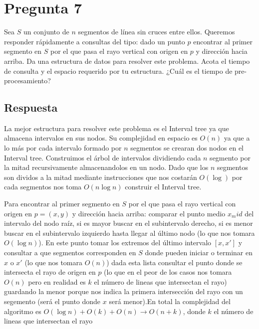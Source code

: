 \section*{Pregunta 7}
\noindent Sea $S$ un conjunto de $n$ segmentos de línea sin cruces entre ellos.
  Queremos responder rápidamente a consultas del tipo: dado un punto $p$ encontrar al primer segmento en $S$ por el que pasa el rayo vertical con origen en $p$ y dirección hacia arriba.
  Da una estructura de datos para resolver este problema.
  Acota el tiempo de consulta y el espacio requerido por tu estructura.
  ¿Cuál es el tiempo de pre-procesamiento?

\subsection*{Respuesta}
La mejor estructura para resolver este problema es el Interval tree ya que almacena intervalos en sus nodos. Su complejidad en espacio es $O(n)$ ya que a lo más por cada intervalo formado por $n$ segmentos se crearan dos nodos en el Interval tree. Construimos el árbol de intervalos dividiendo cada $n$ segmento por la mitad recursivamente almacenandolos en un nodo. Dado que los $n$ segmentos son dividos a la mitad mediante instrucciones que nos costarán $O(\log)$ por cada segmentos nos toma $O(n \log n)$ construir el Interval tree.

Para encontrar al primer segmento en $S$ por el que pasa el rayo vertical con origen en $p=(x,y)$ y dirección hacia arriba: comparar el punto medio $x_mid$ del intervalo del nodo raíz, si es mayor buscar en el subintervalo derecho, si es menor buscar en el subintervalo izquierdo hasta llegar al último nodo (lo que nos tomara $O(\log n)$). En este punto tomar los extremos del último intervalo $[x,x']$ y consultar a que segmentos corresponden en $S$ donde pueden iniciar o terminar en $x$ o $x'$ (lo que nos tomara $O(n)$) dada esta lista consultar el punto donde se intersecta el rayo de origen en $p$ (lo que en el peor de los casos nos tomara $O(n)$ pero en realidad es $k$ el número de lineas que intersectan el rayo) guardando la menor porque nos indica la primera intersección del rayo con un segemento (será el punto donde $x$ será menor).En total la complejidad del algoritmo es $O(\log n)+O(k)+O(n) \rightarrow O(n+k)$, donde $k$ el número de lineas que intersectan el rayo
\bigskip
